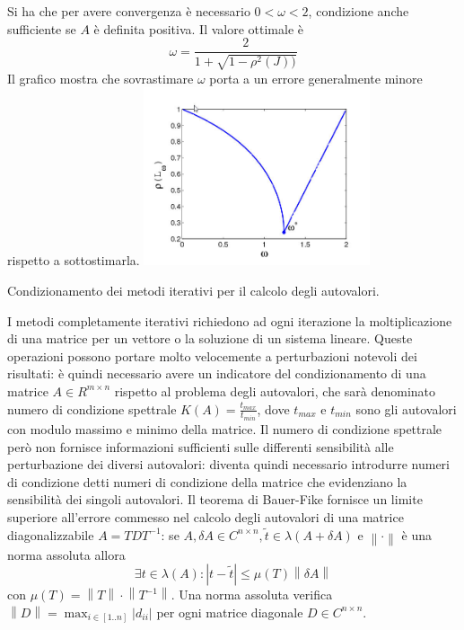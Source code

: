\documentclass[answers, a4paper]{exam}
\newcommand{\norm}[1]{\left\lVert#1\right\rVert}
\begin{document}
\begin{questions}
\begin{solution}
		Si ha che per avere convergenza è necessario $0 < \omega < 2$, condizione anche sufficiente se $A$ è definita positiva. 
		Il valore ottimale è 
		\begin{equation}\omega = \frac{2}{1 + \sqrt{1 - \rho^2(J))}}\end{equation}
		Il grafico mostra che sovrastimare $\omega$ porta a un errore generalmente minore rispetto a sottostimarla.
		\includegraphics[width=0.5\textwidth]{SOR}
	\end{solution}

	\question Condizionamento dei metodi iterativi per il calcolo degli autovalori.
	\begin{solution}
		I metodi completamente iterativi richiedono ad ogni iterazione la moltiplicazione di una matrice per un vettore o la soluzione di un sistema lineare.
		Queste operazioni possono portare molto velocemente a perturbazioni notevoli dei risultati: è quindi necessario avere un indicatore del condizionamento di una matrice $A \in R^{m \times n}$ rispetto al problema degli autovalori, che sarà denominato numero di condizione spettrale $K(A) = \frac{t_{max}}{t_{min}}$, dove $t_{max}$ e $t_{min}$ sono gli autovalori con modulo massimo e minimo della matrice.
		Il numero di condizione spettrale però non fornisce informazioni sufficienti sulle differenti sensibilità alle perturbazione dei diversi autovalori: diventa quindi necessario introdurre numeri di condizione detti numeri di condizione della matrice che evidenziano la sensibilità dei singoli autovalori.
		Il teorema di Bauer-Fike fornisce un limite superiore all'errore commesso nel calcolo degli autovalori di una matrice diagonalizzabile $A = TDT^{-1}$: se $A, \delta A \in C^{n \times n},  \tilde{t} \in \lambda(A + \delta A)$  e $\norm{\cdot}$ è una norma assoluta allora 
		\begin{equation}
		\exists t \in \lambda(A): |t - \tilde{t}| \leq \mu(T)\norm{\delta A}	
		\end{equation} con $\mu(T) = \norm{T} \cdot \norm{T^{-1}}$.
		Una norma assoluta verifica $\norm{D} = \max_{i \in [1..n]} |{d_{ii}}|$ per ogni matrice diagonale $D \in C^{n \times n}$.


\end{solution}
\end{questions}
\end{document}
